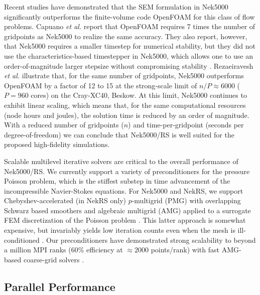 Recent studies
have demonstrated that the SEM formulation in Nek5000 significantly outperforms
the finite-volume code OpenFOAM for this class of flow problems.  Capuano {\em
et al.} \cite{capuano19} report that OpenFOAM requires 7 times the number of
gridpoints as Nek5000 to realize the same accuracy.  They also report, however,
that Nek5000 requires a smaller timestep for numerical stability, but they did
not use the characteristics-based timestepper in Nek5000, which allows one to
use an order-of-magnitude larger stepsize without compromising stability
\cite{patel18}.  Rezaeiravesh {\em et al.} \cite{schlatter21} illustrate that,
for the same number of gridpoints, Nek5000 outperforms OpenFOAM by a factor
of 12 to 15 at the strong-scale limit of $n/P \approx 6000$ ($P=960$ cores) on
the Cray-XC40, Beskow.  At this limit, Nek5000 continues to exhibit linear
scaling, which means that, for the same computational resources (node hours and
joules), the solution time is reduced by an order of magnitude.  With a reduced
number of gridpoints ($n$) and time-per-gridpoint (seconds per
degree-of-freedom) we can conclude that Nek5000/RS is well suited for the 
proposed high-fidelity simulations.

Scalable multilevel iterative solvers are critical to the overall performance
of Nek5000/RS.   We currently support a variety of preconditioners for the
pressure Poisson problem, which is the stiffest substep in time advancement of
the incompressible Navier-Stokes equations.  For Nek5000 and NekRS, we support
Chebyshev-accelerated (in NekRS only) $p$-multigrid (PMG) with overlapping
Schwarz based smoothers \cite{lottes05,nekrs} and algebraic multigrid (AMG)
applied to a surrogate FEM discretization of the Poisson problem
\cite{pedro19,sao80}.  This latter approach is somewhat expensive, but
invariably yields low iteration counts even when the mesh is ill-conditioned
\cite{fischer97}.  Our preconditioners have demonstrated strong scalability to
beyond a million MPI ranks (60\% efficiency at $\approx 2000$ points/rank) with
fast AMG-based coarse-grid solvers \cite{fischer15}.

\vspace{-.25in}
\subsection{Parallel Performance }
\vspace{-.2in}


